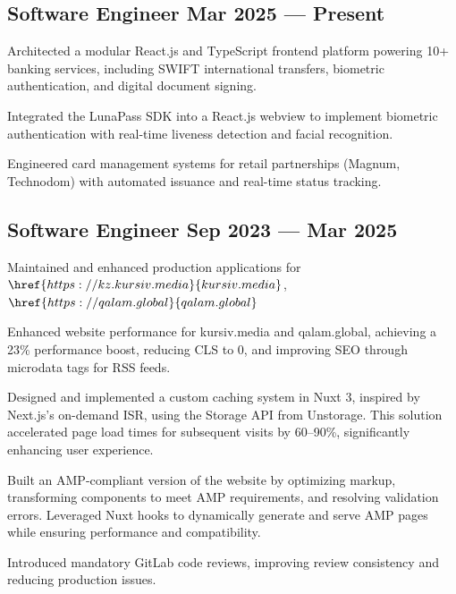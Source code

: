 \subsection{{Software Engineer \hfill Mar 2025 --- Present}}
\begin{zitemize}
\item Architected a modular React.js and TypeScript frontend platform powering 10+ banking services, including SWIFT international transfers, biometric authentication, and digital document signing.
\item Integrated the LunaPass SDK into a React.js webview to implement biometric authentication with real-time liveness detection and facial recognition.
\item Engineered card management systems for retail partnerships (Magnum, Technodom) with automated issuance and real-time status tracking.
\end{zitemize}


\subsection{{Software Engineer \hfill Sep 2023 --- Mar 2025}}
\begin{zitemize}
\item Maintained and enhanced production applications for \(\href{https://kz.kursiv.media}{kursiv.media}\), \(\href{https://qalam.global}{qalam.global}\)
\item Enhanced website performance for kursiv.media and qalam.global, achieving a 23\% performance boost, reducing CLS to 0, and improving SEO through microdata tags for RSS feeds.
\item Designed and implemented a custom caching system in Nuxt 3, inspired by Next.js’s on-demand ISR, using the Storage API from Unstorage. This solution accelerated page load times for subsequent visits by 60–90\%, significantly enhancing user experience.
\item Built an AMP-compliant version of the website by optimizing markup, transforming components to meet AMP requirements, and resolving validation errors. Leveraged Nuxt hooks to dynamically generate and serve AMP pages while ensuring performance and compatibility.
\item Introduced mandatory GitLab code reviews, improving review consistency and reducing production issues.
\end{zitemize}

